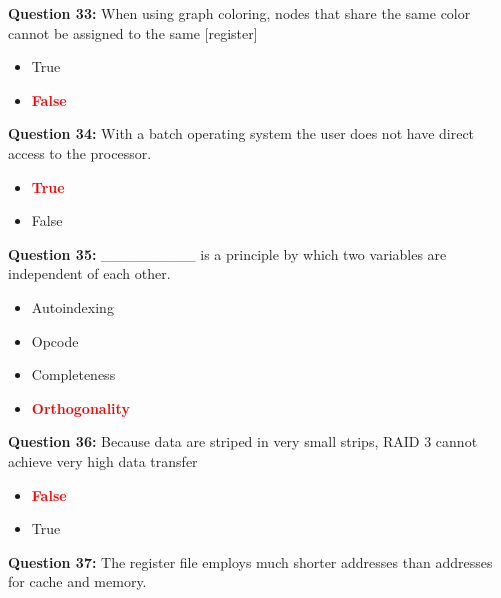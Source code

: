 \documentclass[12pt,a4paper]{article}
\begin{document}
\vspace{0.5cm}

\textbf{Question 33:} When using graph coloring, nodes that share the same color cannot be assigned to the same [register]

\begin{itemize}
    \item[\textbf{A.}] True
    \item[\textbf{B.}] \textcolor{red}{\textbf{False}}
\end{itemize}

\vspace{0.5cm}

\textbf{Question 34:} With a batch operating system the user does not have direct access to the processor.

\begin{itemize}
    \item[\textbf{A.}] \textcolor{red}{\textbf{True}}
    \item[\textbf{B.}] False
\end{itemize}

\vspace{0.5cm}

\textbf{Question 35:} _________ is a principle by which two variables are independent of each other.

\begin{itemize}
    \item[\textbf{A.}] Autoindexing
    \item[\textbf{B.}] Opcode
    \item[\textbf{C.}] Completeness
    \item[\textbf{D.}] \textcolor{red}{\textbf{Orthogonality}}
\end{itemize}

\vspace{0.5cm}

\textbf{Question 36:} Because data are striped in very small strips, RAID 3 cannot achieve very high data transfer

\begin{itemize}
    \item[\textbf{A.}] \textcolor{red}{\textbf{False}}
    \item[\textbf{B.}] True
\end{itemize}

\vspace{0.5cm}

\textbf{Question 37:} The register file employs much shorter addresses than addresses for cache and memory.
\end{document}
